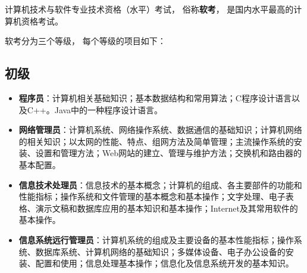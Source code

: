 
\begin{issues}
\issueDraft
\end{issues}

计算机技术与软件专业技术资格（水平）考试， 俗称\textbf{软考}， 是国内水平最高的计算机资格考试。

软考分为三个等级， 每个等级的项目如下：

\subsection{初级}
\begin{itemize}
\item \textbf{程序员}：计算机相关基础知识；基本数据结构和常用算法；C程序设计语言以及C++。Java中的一种程序设计语言。
\item \textbf{网络管理员}：计算机系统、网络操作系统、数据通信的基础知识；计算机网络的相关知识；以太网的性能、特点、组网方法及简单管理；主流操作系统的安装、设置和管理方法；Web网站的建立、管理与维护方法；交换机和路由器的基本配置。
\item \textbf{信息技术处理员}：信息技术的基本概念；计算机的组成、各主要部件的功能和性能指标；操作系统和文件管理的基本概念和基本操作；文字处理、电子表格、演示文稿和数据库应用的基本知识和基本操作；Internet及其常用软件的基本操作。
\item \textbf{信息系统远行管理员}：计算机系统的组成及主要设备的基本性能指标；操作系统、数据库系统、计算机网络的基础知识；多媒体设备、电子办公设备的安装、配置和使用；信息处理基本操作；信息化及信息系统开发的基本知识。
\end{itemize}

